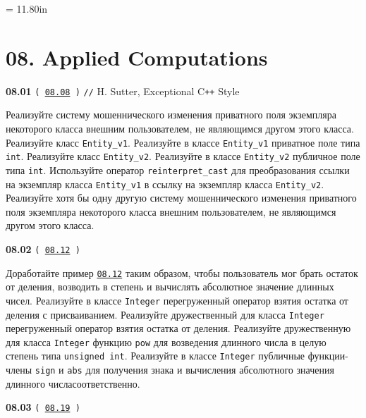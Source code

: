\documentclass[a4paper,12pt]{article}
\begin{document}
\newpage\thispagestyle{empty}\pdfpageheight = 11.80in\enlargethispage{100in}

\section{08. Applied Computations}

{\large \textbf{08.01} \texttt{(\,\href{https://github.com/i-s-m-mipt/Education/blob/master/projects/examples/source/08.08.cpp}{08.08}\,)} \texttt{//} H. Sutter, Exceptional C\texttt{++} Style}

\bigskip

Реализуйте систему мошеннического изменения приватного поля экземпляра некоторого класса внешним пользователем, не являющимся другом этого класса. Реализуйте класс \lstinline{Entity_v1}. Реализуйте в классе \lstinline{Entity_v1} приватное поле типа \lstinline{int}. Реализуйте класс \lstinline{Entity_v2}. Реализуйте в классе \lstinline{Entity_v2} публичное поле типа \lstinline{int}. Используйте оператор \lstinline{reinterpret_cast} для преобразования ссылки на экземпляр класса \lstinline{Entity_v1} в ссылку на экземпляр класса \lstinline{Entity_v2}. Реализуйте хотя бы одну другую систему мошеннического изменения приватного поля экземпляра некоторого класса внешним пользователем, не являющимся другом этого класса.

\bigskip

{\large \textbf{08.02} \texttt{(\,\href{https://github.com/i-s-m-mipt/Education/blob/master/projects/examples/source/08.12.hpp}{08.12}\,)}}

\bigskip

Доработайте пример \href{https://github.com/i-s-m-mipt/Education/blob/master/projects/examples/source/08.12.hpp}{\texttt{08.12}} таким образом, чтобы пользователь мог брать остаток от деления, возводить в степень и вычислять абсолютное значение длинных чисел. Реализуйте в классе \lstinline{Integer} перегруженный оператор взятия остатка от деления с присваиванием. Реализуйте дружественный для класса \lstinline{Integer} перегруженный оператор взятия остатка от деления. Реализуйте дружественную для класса \lstinline{Integer} функцию \lstinline{pow} для возведения длинного числа в целую степень типа \lstinline{unsigned int}. Реализуйте в классе \lstinline{Integer} публичные функции- члены \lstinline{sign} и \lstinline{abs} для получения знака и вычисления абсолютного значения длинного числа\:соответственно.

\bigskip

{\large \textbf{08.03} \texttt{(\,\href{https://github.com/i-s-m-mipt/Education/blob/master/projects/examples/source/08.19.cpp}{08.19}\,)}}
\end{document}
